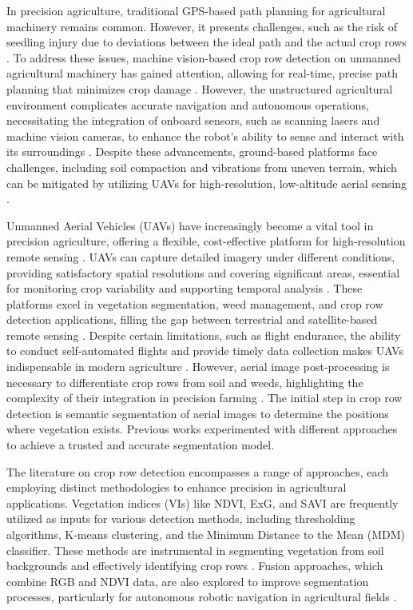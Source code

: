 \documentclass[conference]{IEEEtran}
\begin{document}
In precision agriculture, traditional GPS-based path planning for agricultural machinery remains common. However, it presents challenges, such as the risk of seedling injury due to deviations between the ideal path and the actual crop rows \cite{b1}. To address these issues, machine vision-based crop row detection on unmanned agricultural machinery has gained attention, allowing for real-time, precise path planning that minimizes crop damage \cite{b1,b8}. However, the unstructured agricultural environment complicates accurate navigation and autonomous operations, necessitating the integration of onboard sensors, such as scanning lasers and machine vision cameras, to enhance the robot's ability to sense and interact with its surroundings \cite{b2,b3}. Despite these advancements, ground-based platforms face challenges, including soil compaction and vibrations from uneven terrain, which can be mitigated by utilizing UAVs for high-resolution, low-altitude aerial sensing \cite{b10}.

Unmanned Aerial Vehicles (UAVs) have increasingly become a vital tool in precision agriculture, offering a flexible, cost-effective platform for high-resolution remote sensing  \cite{b9,b12}. UAVs can capture detailed imagery under different conditions, providing satisfactory spatial resolutions and covering significant areas, essential for monitoring crop variability and supporting temporal analysis \cite{b10,b12}. These platforms excel in vegetation segmentation, weed management, and crop row detection applications, filling the gap between terrestrial and satellite-based remote sensing \cite{b7,b13}. Despite certain limitations, such as flight endurance, the ability to conduct self-automated flights and provide timely data collection makes UAVs indispensable in modern agriculture \cite{b11,b13}. However, aerial image post-processing is necessary to differentiate crop rows from soil and weeds, highlighting the complexity of their integration in precision farming \cite{b6}.
The initial step in crop row detection is semantic segmentation of aerial images to determine the positions where vegetation exists. Previous works experimented with different approaches to achieve a trusted and accurate segmentation model.


The literature on crop row detection encompasses a range of approaches, each employing distinct methodologies to enhance precision in agricultural applications. Vegetation indices (VIs) like NDVI, ExG, and SAVI are frequently utilized as inputs for various detection methods, including thresholding algorithms, K-means clustering, and the Minimum Distance to the Mean (MDM) classifier. These methods are instrumental in segmenting vegetation from soil backgrounds and effectively identifying crop rows \cite{b1,b6,b13}. Fusion approaches, which combine RGB and NDVI data, are also explored to improve segmentation processes, particularly for autonomous robotic navigation in agricultural fields \cite{b5}.
\end{document}

